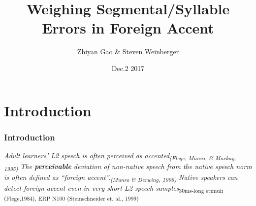 \documentclass{beamer}
\title[Dissertation Proposal]{ Weighing Segmental/Syllable Errors in Foreign Accent} %
\author{Zhiyan Gao \& Steven Weinberger} %
\institute[GMU] %
{
George Mason University \\ %
\medskip
\textit{Accents 2017} %
}
\date{Dec.2 2017} %
\begin{document}
\begin{frame}
\titlepage %
\end{frame}



\section{Introduction}
\begin{frame}
\frametitle{Introduction}
\begin{enumerate}
\linebreak\linebreak
{}\textit{Adult learners' L2 speech is often perceived as accented\linebreak\textsubscript{(Flege, Munro, \& Mackay, 1995)}}\linebreak
\linebreak
{}\textit{The {\bf perceivable} deviation of non-native speech from the native speech norm is often defined as “foreign accent”.\linebreak\textsubscript {(Munro \& Derwing, 1998)} }\linebreak
\linebreak
{}\linebreak\linebreak
{}\textit{Native speakers can detect foreign accent even in very short L2 speech samples}\linebreak\textsubscript{30ms-long stimuli (Flege,1984), ERP N100 (Steinschneider et. al., 1999)}
\end{enumerate}
\end{frame}
\end{document}
